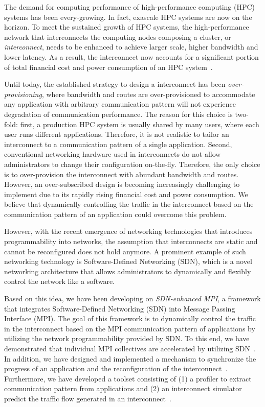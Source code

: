 \documentclass[graybox]{svmult}
\begin{document}
The demand for computing performance of high-performance computing (HPC)
systems has been every-growing. In fact, exascale HPC systems are now on the
horizon. To meet the sustained growth of HPC systems, the high-performance
network that interconnects the computing nodes composing a cluster, or
\textit{interconnect}, needs to be enhanced to achieve larger scale, higher
bandwidth and lower latency. As a result, the interconnect now accounts for a
significant portion of total financial cost and power consumption of an HPC
system~\cite{Michelogiannakis2017}.

Until today, the established strategy to design a interconnect has been
\textit{over-provisioning}, where bandwidth and routes are over-provisioned to
accommodate any application with arbitrary communication pattern will not
experience degradation of communication performance. The reason for this
choice is two-fold: first, a production HPC system is usually shared by many
users, where each user runs different applications. Therefore, it is not
realistic to tailor an interconnect to a communication pattern of a single
application. Second, conventional networking hardware used in interconnects do
not allow administrators to change their configuration on-the-fly. Therefore,
the only choice is to over-provision the interconnect with abundant bandwidth
and routes. However, an over-subscribed design is becoming increasingly
challenging to implement due to its rapidly rising financial cost and power
consumption. We believe that dynamically controlling the traffic in the
interconnect based on the communication pattern of an application could
overcome this problem.

However, with the recent emergence of networking technologies that introduces
programmability into networks, the assumption that interconnects are static
and cannot be reconfigured does not hold anymore. A prominent example of such
networking technology is Software-Defined Networking (SDN), which is a novel
networking architecture that allows administrators to dynamically and flexibly
control the network like a software.

Based on this idea, we have been developing on \textit{SDN-enhanced MPI}, a
framework that integrates Software-Defined Networking (SDN) into Message
Passing Interface (MPI). The goal of this framework is to dynamically control
the traffic in the interconnect based on the MPI communication pattern of
applications by utilizing the network programmability provided by SDN\@. To
this end, we have demonstrated that individual MPI collectives are accelerated
by utilizing SDN~\cite{Dashdavaa2014,Takahashi2014}. In addition, we have
designed and implemented a mechanism to synchronize the progress of an
application and the reconfiguration of the
interconnect~\cite{Takahashi2015,Takahashi2018}. Furthermore, we have
developed a toolset consisting of (1) a profiler to extract communication
pattern from applications and (2) an interconnect simulator predict the
traffic flow generated in an interconnect~\cite{Takahashi2017}.
\end{document}
